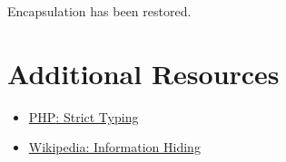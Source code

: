 Encapsulation has been restored.



\section{Additional Resources}

\begin{itemize}[leftmargin=*]
    \item \href{http://www.php.net/manual/en/functions.arguments.php#functions.arguments.type-declaration.strict}{PHP: Strict Typing}
    \item \href{https://en.wikipedia.org/wiki/Information_hiding}{Wikipedia: Information Hiding}
\end{itemize}
